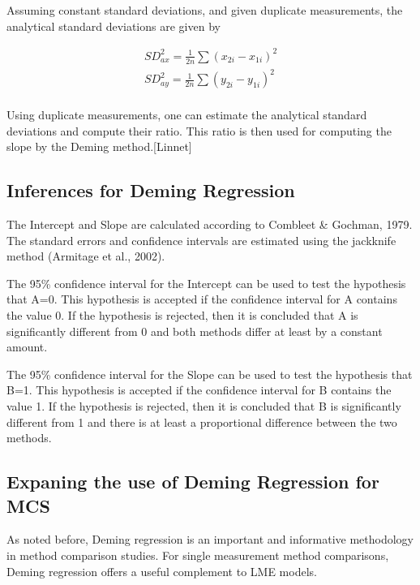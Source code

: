 \documentclass[12pt, a4paper]{report}
\theoremstyle{plain}
\theoremstyle{definition}
\theoremstyle{remark}
\begin{document}
Assuming constant standard deviations, and given duplicate measurements, the analytical standard deviations are given by

\begin{eqnarray*}
	SD^{2}_{ax} = \frac{1}{2n} \sum (x_{2i} - x_{1i})^{2}\\
	SD^{2}_{ay} = \frac{1}{2n} \sum (y_{2i} - y_{1i})^{2}\\
\end{eqnarray*}

Using duplicate measurements, one can estimate the analytical
standard deviations and compute their ratio. This ratio is then
used for computing the slope by the Deming method.[Linnet]



\subsection{Inferences for Deming Regression}
The Intercept and Slope are calculated according to Combleet \& Gochman, 1979. The standard errors and confidence intervals are estimated using the jackknife method (Armitage et al., 2002).

The 95\% confidence interval for the Intercept can be used to test the hypothesis that A=0. This hypothesis is accepted if the confidence interval for A contains the value 0. If the hypothesis is rejected, then it is concluded that A is significantly different from 0 and both methods differ at least by a constant amount.

The 95\% confidence interval for the Slope can be used to test the hypothesis that B=1. This hypothesis is accepted if the confidence interval for B contains the value 1. If the hypothesis is rejected, then it is concluded that B is significantly different from 1 and there is at least a proportional difference between the two methods.






\subsection{Expaning the use of Deming Regression for MCS}
As noted before, Deming regression is an important and informative methodology in method comparison studies.
For single measurement method comparisons, Deming regression offers a useful complement to LME models.
\end{document}
